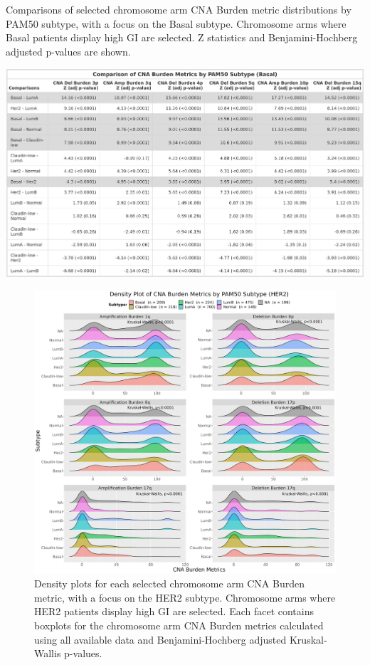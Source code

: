 \begin{table}[!htb]
\center
\caption[Comparisons of selected chromosome arm CNA Burden metric distributions by PAM50 subtype, with a focus on the Basal subtype.]{Comparisons of selected chromosome arm CNA Burden metric distributions by PAM50 subtype, with a focus on the Basal subtype. Chromosome arms where Basal patients display high GI are selected. Z statistics and Benjamini-Hochberg adjusted p-values are shown.}
\includegraphics[width=1\textwidth]{../tables/Chapter_2/ChrArm_CNA_Burden_Metric_Comparisons_Basal.png}
\label{tab:PA-CNA-Score-Metric-Density-P50-5q}
\end{table}

\begin{figure}[!ht]
\center
\includegraphics[width=1\textwidth]{../figures/Chapter_2/ChrArm_CNA_Burden_Metrics_Across_PAM50_HER2_Burden.png}
\caption[Density plots for each selected chromosome arm CNA Burden metric, with a focus on the HER2 subtype.]{Density plots for each selected chromosome arm CNA Burden metric, with a focus on the HER2 subtype. Chromosome arms where HER2 patients display high GI are selected. Each facet contains boxplots for the chromosome arm CNA Burden metrics calculated using all available data and Benjamini-Hochberg adjusted Kruskal-Wallis p-values.}

\label{fig:PA-CNA-Score-Metric-Density-P50-17q}
\end{figure}

